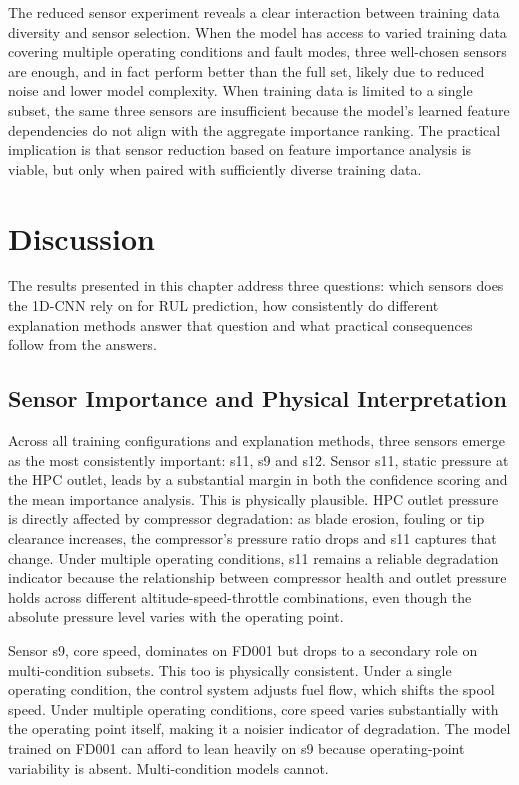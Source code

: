 The reduced sensor experiment reveals a clear interaction between training data diversity and sensor selection. When the model has access to varied training data covering multiple operating conditions and fault modes, three well-chosen sensors are enough, and in fact perform better than the full set, likely due to reduced noise and lower model complexity. When training data is limited to a single subset, the same three sensors are insufficient because the model's learned feature dependencies do not align with the aggregate importance ranking. The practical implication is that sensor reduction based on feature importance analysis is viable, but only when paired with sufficiently diverse training data.

\section{Discussion}
\label{sec:discussion}
The results presented in this chapter address three questions: which sensors does the 1D-CNN rely on for RUL prediction, how consistently do different explanation methods answer that question and what practical consequences follow from the answers.

\subsection{Sensor Importance and Physical Interpretation}
Across all training configurations and explanation methods, three sensors emerge as the most consistently important: s11, s9 and s12. Sensor s11, static pressure at the HPC outlet, leads by a substantial margin in both the confidence scoring and the mean importance analysis. This is physically plausible. HPC outlet pressure is directly affected by compressor degradation: as blade erosion, fouling or tip clearance increases, the compressor's pressure ratio drops and s11 captures that change. Under multiple operating conditions, s11 remains a reliable degradation indicator because the relationship between compressor health and outlet pressure holds across different altitude-speed-throttle combinations, even though the absolute pressure level varies with the operating point.

Sensor s9, core speed, dominates on FD001 but drops to a secondary role on multi-condition subsets. This too is physically consistent. Under a single operating condition, the control system adjusts fuel flow, which shifts the spool speed. Under multiple operating conditions, core speed varies substantially with the operating point itself, making it a noisier indicator of degradation. The model trained on FD001 can afford to lean heavily on s9 because operating-point variability is absent. Multi-condition models cannot.

